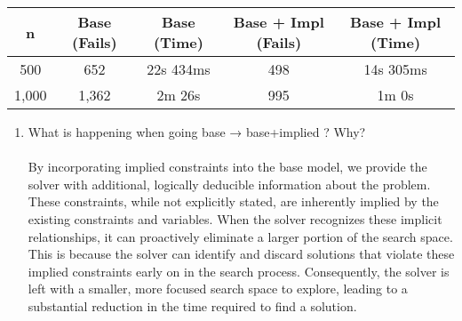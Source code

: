 \documentclass{article}
\begin{document}
\begin{tabular}{||c c c c c||} 
 \hline
 n & Base (Fails) & Base (Time) & Base + Impl (Fails) & Base + Impl (Time) \\ 
 \hline\hline
 500	& 652 & 22s 434ms & 498 & 14s 305ms \\
 \hline
 1,000 & 1,362 & 2m 26s & 995 & 1m 0s \\
 \hline
\end{tabular}

\begin{enumerate}
\item What is happening when going base → base+implied ? Why? \\ \\
By incorporating implied constraints into the base model, we provide the solver with additional, logically deducible information about the problem. These constraints, while not explicitly stated, are inherently implied by the existing constraints and variables. When the solver recognizes these implicit relationships, it can proactively eliminate a larger portion of the search space. This is because the solver can identify and discard solutions that violate these implied constraints early on in the search process. Consequently, the solver is left with a smaller, more focused search space to explore, leading to a substantial reduction in the time required to find a solution.
\end{enumerate}
\end{document}
